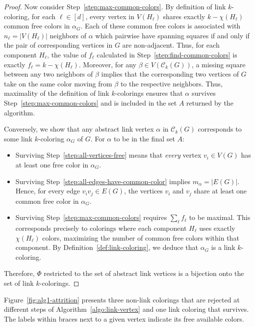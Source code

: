 \documentclass{amsart}
\theoremstyle{hypothesisstyle}
\theoremstyle{definition}
\theoremstyle{remark}
\numberwithin{equation}{section}
\newcommand{\abs}[1]{\lvert#1\rvert}
\newcommand{\C}{\mathcal C}
\begin{document}
\begin{proof}
Now consider Step~\ref{step:max-common-colors}. By definition of link $k$-coloring, for each $\ell\in[d]$, every vertex in $V(H_\ell)$ shares exactly $k-\chi(H_\ell)$ common free colors in $\alpha_G$. Each of these common free colors is associated with $n_\ell=\abs{V(H_\ell)}$ neighbors of $\alpha$ which pairwise have spanning squares if and only if the pair of corresponding vertices in $G$ are non-adjacent. Thus, for each component $H_{\ell}$, the value of $f_{\ell}$ calculated in Step~\ref{step:find-common-colors} is exactly $f_\ell=k-\chi(H_\ell)$. Moreover, for any $\beta\in V(\C_k(G))$, a missing square between any two neighbors of  $\beta$ implies that the corresponding two vertices of $G$ take on the same color moving from $\beta$ to the respective neighbors. Thus, maximality of the definition of link $k$-colorings ensures that $\alpha$ survives Step~\ref{step:max-common-colors} and is included in the set $A$ returned by the algorithm.

Conversely, we show that any abstract link vertex $\alpha$ in $\mathcal{C}_k(G)$ corresponds to some link $k$-coloring $\alpha_G$ of $G$. For $\alpha$ to be in the final set $A$:
\begin{itemize}
    \item Surviving Step~\ref{step:all-vertices-free} means that \emph{every} vertex $v_i\in V(G)$ has at least one free color in $\alpha_G$.
    \item Surviving Step~\ref{step:all-edges-have-common-color} implies $m_{\alpha}=|E(G)|$. Hence, for every edge $v_i v_j\in E(G)$, the vertices $v_i$ and $v_j$ share at least one common free color in $\alpha_G$.
    \item Surviving Step~\ref{step:max-common-colors} requires $\sum_{\ell} f_{\ell}$ to be maximal. This corresponds precisely to colorings where each component $H_{\ell}$ uses exactly $\chi(H_{\ell})$ colors, maximizing the number of common free colors within that component. By Definition~\ref{def:link-coloring}, we deduce that $\alpha_G$ is a link $k$-coloring. 
\end{itemize}
Therefore, $\Phi$ restricted to the set of abstract link vertices is a bijection onto the set of link $k$-colorings. 
\end{proof}

Figure~\ref{fig:alg1-attrition} presents three non-link colorings that are rejected at different steps of Algorithm~\ref{algo:link-vertex} and one link coloring that survives. The labels within braces next to a given vertex indicate its free available colors.
\end{document}
